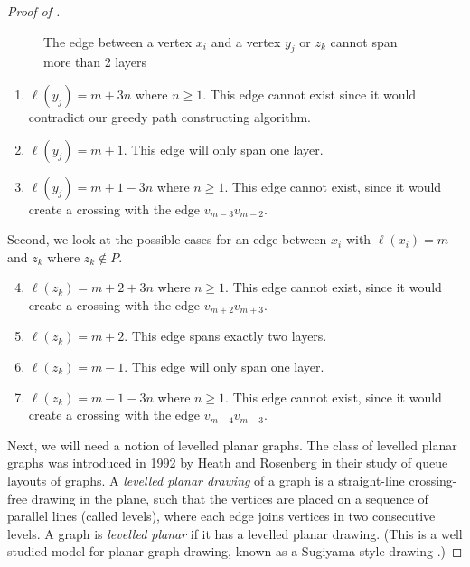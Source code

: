 \documentclass{patmorin}
\begin{document}
\begin{proof}[Proof of ]
\begin{figure}
\begin{center}
    \caption{The edge between a vertex $x_i$ and a vertex $y_j$ or $z_k$ cannot span more than 2 layers}
 \end{center}
    \end{figure}
 
  \begin{enumerate}
  	\item$\ell(y_j) =  m+3n$ where $n \geq 1$. This edge cannot exist since it would contradict our greedy path constructing algorithm. 
  	\item$\ell(y_j) =  m+1$. This edge will only span one layer.
  	\item $\ell(y_j) = m+1-3n$ where $n \geq 1$. This edge cannot exist, since it would create a crossing with the edge $v_{m-3}v_{m-2}$.
  \end{enumerate}
  
  Second, we look at the possible cases for an edge between $x_i$ with $\ell(x_i) = m$ and $z_k$ where $z_k \notin P$. 
 \begin{enumerate}
  \setcounter{enumi}{3}
  	\item $\ell(z_k) = m+2+3n$ where $n \geq 1$. This edge cannot exist, since it would create a crossing with the edge $v_{m+2}v_{m+3}$.
  	\item$\ell(z_k) =  m+2$. This edge spans exactly two layers.
  	\item$\ell(z_k) =  m-1$. This edge will only span one layer.
  	\item $\ell(z_k) =  m-1-3n$ where $n \geq 1$. This edge cannot exist, since it would create a crossing with the edge $v_{m-4}v_{m-3}$.
  \end{enumerate}


  Next, we will need a notion of levelled planar graphs. The class of levelled
  planar graphs was introduced in 1992 by Heath and Rosenberg
  \cite{HR-SJC92} in their study of queue layouts of graphs. A \emph{levelled
  planar drawing} of a graph is a straight-line crossing-free drawing in
  the plane, such that the vertices are placed on a sequence of parallel
  lines (called levels), where each edge joins vertices in two
  consecutive levels. A graph is \emph{levelled planar} if it has a levelled
  planar drawing. (This is a well studied model for planar
  graph drawing, known as a Sugiyama-style drawing \cite{STT81,BM2001,HN2013,BETT99}.)


\end{proof}
\end{document}
